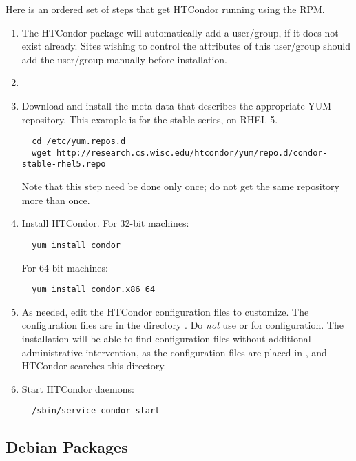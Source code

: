 Here is an ordered set of steps that get HTCondor running using the RPM.
\begin{enumerate}
\item The HTCondor package will automatically add a  user/group,
if it does not exist already.
Sites wishing to control the attributes of this user/group 
should add the  user/group manually before installation.

\item
\item Download and install the meta-data that describes 
the appropriate YUM repository. 
This example is for the stable series, on RHEL 5. 
\footnotesize
\begin{verbatim}
  cd /etc/yum.repos.d
  wget http://research.cs.wisc.edu/htcondor/yum/repo.d/condor-stable-rhel5.repo
\end{verbatim}
\normalsize
Note that this step need be done only once;
do not get the same repository more than once.

\item Install HTCondor.
For 32-bit machines:
\begin{verbatim}
  yum install condor
\end{verbatim}
For 64-bit machines:
\begin{verbatim}
  yum install condor.x86_64
\end{verbatim}

\item As needed, edit the HTCondor configuration files to customize.
The configuration files are in the directory  .
Do \emph{not} use  or  for configuration.
The installation will be able to find configuration files without
additional administrative intervention,
as the configuration files are placed in ,
and HTCondor searches this directory.

\item Start HTCondor daemons:
\begin{verbatim}
  /sbin/service condor start
\end{verbatim}

\end{enumerate}


\subsection{\label{sec:install-debs} Debian Packages}

